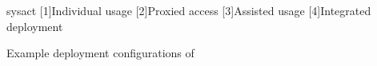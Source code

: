 %
%

\begin{NewFig}{sysact}
%
	[1]{Individual usage}%
	[2]{Proxied access}
%
	[3]{Assisted usage}%
	[4]{Integrated deployment}
\caption{Example deployment configurations of \Menugene}
\end{NewFig}

